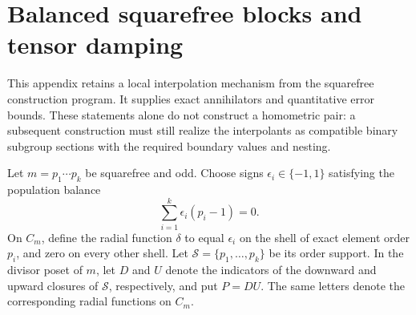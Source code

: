 \section{Balanced squarefree blocks and tensor damping}
\label{v2:app:squarefree-damping}

This appendix retains a local interpolation mechanism from the squarefree
construction program.  It supplies exact annihilators and quantitative error
bounds.  These statements alone do not construct a homometric pair: a
subsequent construction must still realize the interpolants as compatible
binary subgroup sections with the required boundary values and nesting.

Let $m=p_1\cdots p_k$ be squarefree and odd.  Choose signs
$\epsilon_i\in\{-1,1\}$ satisfying the population balance
\begin{equation}\label{v2:eq:balanced-singletons}
 \sum_{i=1}^k\epsilon_i(p_i-1)=0.
\end{equation}
On $C_m$, define the radial function $\delta$ to equal $\epsilon_i$ on
the shell of exact element order $p_i$, and zero on every other shell.
Let $\mathcal S=\{p_1,\ldots,p_k\}$ be its order support.  In the divisor
poset of $m$, let $D$ and $U$ denote the indicators of the downward and
upward closures of $\mathcal S$, respectively, and put $P=DU$.
The same letters denote the corresponding radial functions on $C_m$.

